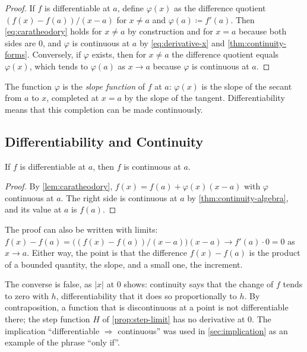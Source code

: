 \begin{proof}
If $f$ is differentiable at $a$, define $\varphi(x)$ as the difference quotient $(f(x)-f(a))/(x-a)$ for $x\ne a$ and $\varphi(a)\coloneqq f'(a)$. Then \eqref{eq:caratheodory} holds for $x\ne a$ by construction and for $x=a$ because both sides are $0$, and $\varphi$ is continuous at $a$ by \eqref{eq:derivative-x} and \cref{thm:continuity-forms}. Conversely, if $\varphi$ exists, then for $x\ne a$ the difference quotient equals $\varphi(x)$, which tends to $\varphi(a)$ as $x\to a$ because $\varphi$ is continuous at $a$.
\end{proof}

The function $\varphi$ is the \emph{slope function} of $f$ at $a$: $\varphi(x)$ is the slope of the secant from $a$ to $x$, completed at $x=a$ by the slope of the tangent. Differentiability means that this completion can be made continuously.

\subsection{Differentiability and Continuity}

\begin{proposition}
\label{prop:diff-continuous}
If $f$ is differentiable at $a$, then $f$ is continuous at $a$.
\end{proposition}

\begin{proof}
By \cref{lem:caratheodory}, $f(x)=f(a)+\varphi(x)(x-a)$ with $\varphi$ continuous at $a$. The right side is continuous at $a$ by \cref{thm:continuity-algebra}, and its value at $a$ is $f(a)$.
\end{proof}

The proof can also be written with limits: $f(x)-f(a)=\bigl((f(x)-f(a))/(x-a)\bigr)(x-a)\to f'(a)\cdot0=0$ as $x\to a$. Either way, the point is that the difference $f(x)-f(a)$ is the product of a bounded quantity, the slope, and a small one, the increment.

The converse is false, as $|x|$ at $0$ shows: continuity says that the change of $f$ tends to zero with $h$, differentiability that it does so proportionally to $h$. By contraposition, a function that is discontinuous at a point is not differentiable there; the step function $H$ of \cref{prop:step-limit} has no derivative at $0$. The implication ``differentiable $\Rightarrow$ continuous'' was used in \cref{sec:implication} as an example of the phrase ``only if''.

